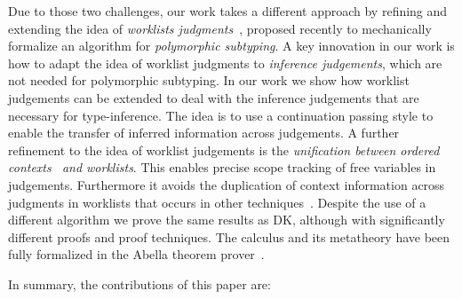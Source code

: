 Due to those two challenges, our work takes a different approach by refining and
extending the idea of \emph{worklists judgments}~\cite{itp2018},
proposed recently to mechanically formalize an algorithm for
\emph{polymorphic subtyping}. A key innovation in our work is how
to adapt the idea of worklist judgments to
\emph{inference judgements}, which are not needed for polymorphic subtyping.
In our work we show how worklist
judgements can be extended to deal with the inference judgements that
are necessary for type-inference.  The idea is to use a continuation
passing style to enable the transfer of inferred information across
judgements. A further refinement to the idea of worklist judgements is
the \emph{unification between ordered
  contexts~\cite{gundry2010type,dunfield2013complete} and worklists}.  This
enables precise scope tracking of free variables in
judgements. Furthermore it avoids the duplication of context
information across judgments in worklists that occurs in other
techniques~\cite{Reed2009,Abel2011higher}.
Despite the use of a different algorithm we prove the
same results as DK, although with significantly different proofs and
proof techniques. The calculus and its metatheory
have been fully formalized in the Abella theorem prover~\cite{AbellaDesc}.

In summary, the contributions of this paper are:

